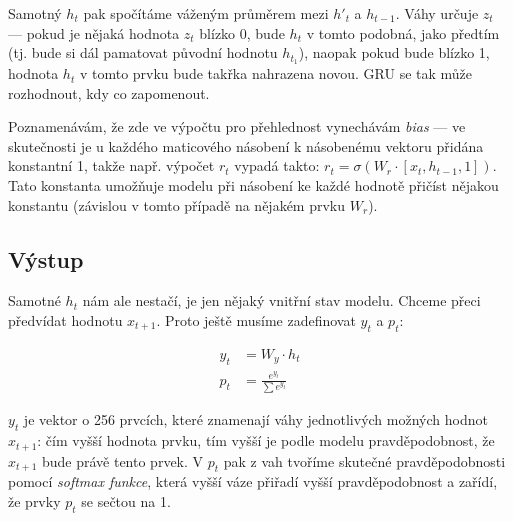 \documentclass[a4]{article}
\begin{document}
Samotný $h_t$ pak spočítáme váženým průměrem mezi $h'_t$ a $h_{t-1}$. Váhy určuje $z_t$ --- pokud je nějaká hodnota $z_t$ blízko 0, bude $h_t$ v tomto podobná, jako předtím (tj. bude si dál pamatovat původní hodnotu $h_{t_1}$), naopak pokud bude blízko 1, hodnota $h_t$ v tomto prvku bude takřka nahrazena novou. GRU se tak může rozhodnout, kdy co zapomenout.

Poznamenávám, že zde ve výpočtu pro přehlednost vynechávám \textit{bias} --- ve skutečnosti je u každého maticového násobení k násobenému vektoru přidána konstantní 1, takže např. výpočet $r_t$ vypadá takto: $r_t = \sigma(W_r \cdot [x_t, h_{t-1}, 1])$. Tato konstanta umožňuje modelu při násobení ke každé hodnotě přičíst nějakou konstantu (závislou v tomto případě na nějakém prvku $W_r$).

\subsection{Výstup}
Samotné $h_t$ nám ale nestačí, je jen nějaký vnitřní stav modelu. Chceme přeci předvídat hodnotu $x_{t+1}$. Proto ještě musíme zadefinovat $y_t$ a $p_t$:

\begin{align*}
y_t &= W_y \cdot h_t \\
p_t &= \frac{e^{y_t}}{\sum e^{y_t}}
\end{align*}

$y_t$ je vektor o 256 prvcích, které znamenají váhy jednotlivých možných hodnot $x_{t+1}$: čím vyšší hodnota prvku, tím vyšší je podle modelu pravděpodobnost, že $x_{t+1}$ bude právě tento prvek. V $p_t$ pak z vah tvoříme skutečné pravděpodobnosti pomocí \textit{softmax funkce}, která vyšší váze přiřadí vyšší pravděpodobnost a zařídí, že prvky $p_t$ se sečtou na 1.

\end{document}
